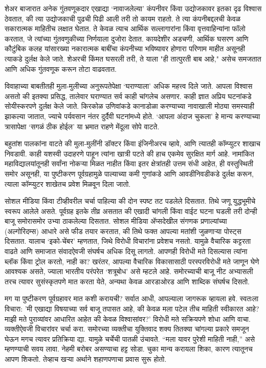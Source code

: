 शेअर बाजारात अनेक गुंतवणूकदार एखाद्या ‘नावाजलेल्या’ कंपनीवर किंवा उद्योजकावर इतका दृढ विश्वास ठेवतात, की त्या उद्योजकाची पुढची पिढी आली तरी तो कायम राहतो. ते त्या कंपनीबद्दलची केवळ सकारात्मक माहितीच लक्षात घेतात. ते केवळ त्याच आर्थिक सल्लागारांना किंवा वृत्तवाहिन्यांना फॉलो करतात, जे त्यांच्या गुंतवणुकीच्या निर्णयाला दुजोरा देतात. कायदेशीर अडचणी, आर्थिक घसरण आणि कौटुंबिक कलह यांसारख्या नकारात्मक बाबींचा कंपनीच्या भविष्यावर होणारा परिणाम माहीत असूनही त्याकडे दुर्लक्ष केले जाते. शेअरची किंमत घसरली तरी, ते याला "ही तात्पुरती बाब आहे," असेच समजतात आणि अधिक गुंतवणूक करून तोटा वाढवतात.

विवाहाच्या बाबतीतही मुला-मुलीच्या अनुरूपतेपेक्षा ‘घराण्याला’ अधिक महत्त्व दिले जाते. आपला विश्वास असतो की इतक्या प्रसिद्ध, तालेवार घराण्यात सर्व काही चांगलेच असणार. काही ज्ञात अप्रिय घटनांकडे सोयीस्करपणे दुर्लक्ष केले जाते. किरकोळ उणिवांकडे कानाडोळा करण्याच्या नावाखाली मोठ्या समस्याही झाकल्या जातात, ज्याचे पर्यवसान नंतर दुर्दैवी घटनांमध्ये होते. ‘आपला अंदाज चुकला’ हे मान्य करण्याच्या त्रासापेक्षा ‘सगळं ठीक होईल’ या भ्रमात राहणे मेंदूला सोपे वाटते.

बहुतांश पालकांना वाटते की मुला-मुलींनी डॉक्टर किंवा इंजिनीअरच व्हावे, आणि त्यातही कॉम्प्युटर शाखाच निवडावी. काही यशस्वी उदाहरणे पाहून त्यांना खात्री पटते की हाच एकमेव सुरक्षित मार्ग आहे. नामांकित महाविद्यालयांतूनही सर्वांना नोकऱ्या मिळत नाहीत किंवा इतर क्षेत्रांतही उत्तम संधी आहेत, ही वस्तुस्थिती समोर असूनही, या पुष्टीकरण पूर्वग्रहामुळे पाल्याच्या कमी गुणांकडे आणि आवडीनिवडीकडे दुर्लक्ष करून, त्याला कॉम्प्युटर शाखेतच प्रवेश मिळवून दिला जातो.

सोशल मीडिया किंवा टीव्हीवरील चर्चा पाहिल्या की दोन स्पष्ट तट पडलेले दिसतात. तिथे जणू युद्धभूमीचे स्वरूप आलेले असते. पूर्वग्रह इतके तीव्र असतात की एखादी चांगली किंवा वाईट घटना घडली तरी दोन्ही बाजू समोरासमोर उभ्या ठाकलेल्या दिसतात. सोशल मीडिया ॲप्सदेखील संगणक प्रणाल्यांच्या (अल्गोरिदम्स) आधारे असे फीड तयार करतात, की तिथे फक्त आपल्या मतांशी जुळणाऱ्या पोस्ट्स दिसतात. यालाच ‘इको-चेंबर’ म्हणतात, जिथे विरोधी विचारांना प्रवेशच नसतो. यामुळे वैचारिक कट्टरता वाढते आणि समाजात संवादऐवजी संघर्षच अधिक दिसू लागतो. आपणही विरोधी मते दिसल्यास त्यांना ब्लॉक किंवा ट्रोल करतो, नाही का? खरंतर, आपल्या वैचारिक विकासासाठी परस्परविरोधी मते जाणून घेणे आवश्यक असते, ज्याला भारतीय परंपरेत ‘शत्रूबोध’ असे म्हटले आहे. समोरच्याची बाजू नीट अभ्यासली तरच त्यावर सुसंस्कृतपणे मात करता येते, अन्यथा केवळ आरडाओरड आणि शाब्दिक संघर्षच दिसतो.

मग या पुष्टीकरण पूर्वग्रहावर मात कशी करायची? सर्वात आधी, आपल्याला जागरूक व्हायला हवे. स्वतःला विचारा: 'मी एखाद्या विषयाच्या सर्व बाजू तपासत आहे, की केवळ मला पटेल तीच माहिती स्वीकारत आहे? माझी मते पुराव्यांवर आधारित आहेत की केवळ विश्वासांवर?' विरोधी मते सक्रियपणे शोधा आणि वाचा. व्यक्तीऐवजी विचारांवर चर्चा करा. समोरच्या व्यक्तीचा युक्तिवाद शक्य तितक्या चांगल्या प्रकारे समजून घेऊन मगच त्यावर प्रतिक्रिया द्या. यामुळे चर्चेची पातळी उंचावते. “मला यावर पुरेशी माहिती नाही,” असे म्हणण्याची सवय लावा. नेहमी बरोबर असण्याचा हट्ट सोडा. चुका मान्य करायला शिका, कारण त्यातूनच आपण शिकतो. तेव्हाच खऱ्या अर्थाने शहाणपणाचा प्रवास सुरू होतो.

